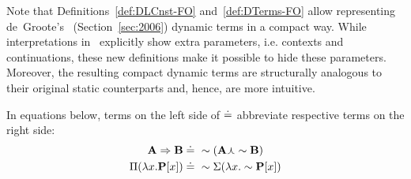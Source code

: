 Note that Definitions~\ref{def:DLCnst-FO} and~\ref{def:DTerms-FO} allow representing de~Groote's~\cite{deGroote:2006:Towards-a-Montagovian-Account-of-Dynamics} (Section~\ref{sec:2006}) dynamic terms in a compact way.  While interpretations in~\cite{deGroote:2006:Towards-a-Montagovian-Account-of-Dynamics} explicitly show extra parameters, i.e. contexts and continuations, these new definitions make it possible to hide these parameters. Moreover, the resulting compact dynamic terms are structurally analogous to their original static counterparts and, hence, are more intuitive.

\begin{remark} In equations below, terms on the left side of $\doteq$ abbreviate respective terms on the right side:
\begin{align} 
\A2 \imp2 \B2 \defeq \ & \n2 (\A2 \cnj2 \n2 \B2) \\
\all2( \lambda \x1. \P2[\x1]) \defeq \ & \n2 \ex2 ( \lambda \x1. \n2 \P2 [\x1] )
\end{align}
\end{remark}


